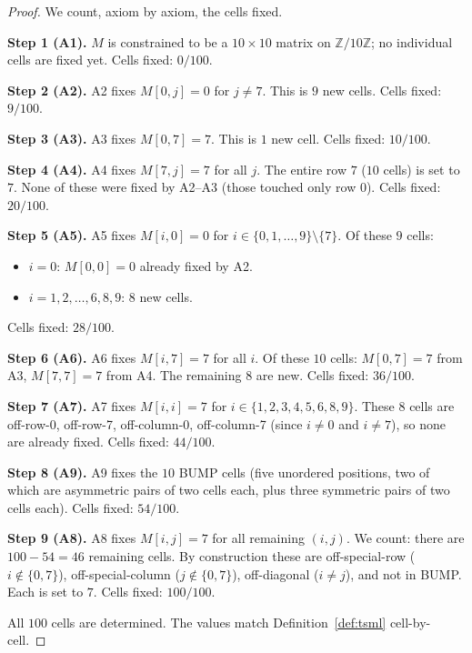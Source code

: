 \documentclass[11pt,reqno]{amsart}
\theoremstyle{plain}
\theoremstyle{definition}
\theoremstyle{remark}
\newcommand{\Z}{\mathbb{Z}}
\begin{document}
\begin{proof}
We count, axiom by axiom, the cells fixed.

\smallskip
\noindent\textbf{Step 1 (A1).} $M$ is constrained to be a $10\times 10$
matrix on $\Z/10\Z$; no individual cells are fixed yet. Cells fixed:
$0/100$.

\noindent\textbf{Step 2 (A2).} A2 fixes $M[0, j] = 0$ for $j \neq 7$.
This is $9$ new cells. Cells fixed: $9/100$.

\noindent\textbf{Step 3 (A3).} A3 fixes $M[0, 7] = 7$. This is $1$ new
cell. Cells fixed: $10/100$.

\noindent\textbf{Step 4 (A4).} A4 fixes $M[7, j] = 7$ for all $j$.
The entire row $7$ ($10$ cells) is set to $7$. None of these were
fixed by A2--A3 (those touched only row $0$). Cells fixed: $20/100$.

\noindent\textbf{Step 5 (A5).} A5 fixes $M[i, 0] = 0$ for
$i \in \{0,1,\ldots,9\} \setminus \{7\}$. Of these $9$ cells:
\begin{itemize}
\item $i = 0$: $M[0, 0] = 0$ already fixed by A2.
\item $i = 1, 2, \ldots, 6, 8, 9$: $8$ new cells.
\end{itemize}
Cells fixed: $28/100$.

\noindent\textbf{Step 6 (A6).} A6 fixes $M[i, 7] = 7$ for all $i$.
Of these $10$ cells: $M[0, 7] = 7$ from A3, $M[7, 7] = 7$ from A4.
The remaining $8$ are new. Cells fixed: $36/100$.

\noindent\textbf{Step 7 (A7).} A7 fixes $M[i, i] = 7$ for
$i \in \{1, 2, 3, 4, 5, 6, 8, 9\}$. These $8$ cells are off-row-0,
off-row-7, off-column-0, off-column-7 (since $i \neq 0$ and $i \neq 7$),
so none are already fixed. Cells fixed: $44/100$.

\noindent\textbf{Step 8 (A9).} A9 fixes the $10$ BUMP cells (five
unordered positions, two of which are asymmetric pairs of two cells
each, plus three symmetric pairs of two cells each). Cells fixed: $54/100$.

\noindent\textbf{Step 9 (A8).} A8 fixes $M[i, j] = 7$ for all
remaining $(i, j)$. We count: there are $100 - 54 = 46$ remaining
cells. By construction these are off-special-row ($i \notin \{0, 7\}$),
off-special-column ($j \notin \{0, 7\}$), off-diagonal ($i \neq j$),
and not in BUMP. Each is set to $7$. Cells fixed: $100/100$.

\smallskip
All $100$ cells are determined. The values match
Definition~\ref{def:tsml} cell-by-cell.
\end{proof}
\end{document}
